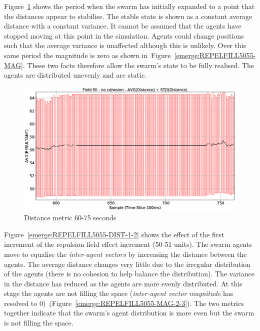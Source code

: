 Figure~\ref{emerge:REPELFILL5055-DIST-1} shows the period when the swarm has initially expanded to a point that the distances appear to stabilise. The stable state is shown as a constant average distance with a constant variance. It cannot be assumed that the agents have stopped moving at this point in the simulation. Agents could change positions such that the average variance is unaffected although this is unlikely. Over this same period the magnitude is zero as shown in~Figure~\ref{emerge:REPELFILL5055-MAG}. These two facts therefore allow the swarm's state to be fully realised. The agents are distributed unevenly and are static.

\begin{figure}[H]
\begin{center}
\includegraphics[width=12cm]{CHAPTER-8/figures/REPELFILL5055-DIST-1}
\end{center}
\caption{Distance metric 60-75 seconds\label{emerge:REPELFILL5055-DIST-1}}
\end{figure}

Figure~\ref{emerge:REPELFILL5055-DIST-1-2} shows the effect of the first increment of the repulsion field effect increment (50-51 units). The swarm agents move to equalise the \textit{inter-agent vectors} by increasing the distance between the agents. The average distance changes very little due to the irregular distribution of the agents (there is no cohesion to help balance the distribution). The variance in the distance has reduced as the agents are more evenly distributed. At this stage the agents are not filling the space (\textit{inter-agent vector magnitude} has resolved to 0)~(Figure~\ref{emerge:REPELFILL5055-MAG-2-3}). The two metrics together indicate that the swarm's agent distribution is more even but the swarm is not filling the space.

